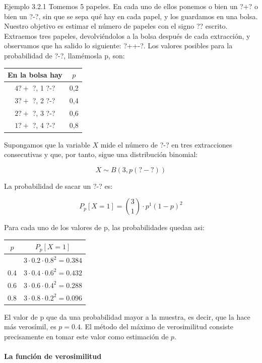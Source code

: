 \documentclass[
]{article}
\begin{document}
Ejemplo 3.2.1 Tomemos 5 papeles. En cada uno de ellos ponemos o bien un ?+? o bien un ?-?, sin que se sepa qué hay en cada papel, y los guardamos en una bolsa. Nuestro objetivo es estimar el número de papeles con el signo ?? escrito. Extraemos tres papeles, devolviéndolos a la bolsa después de cada extracción, y observamos que ha salido lo siguiente: ?++-?. Los valores posibles para la probabilidad de ?-?, llamémosla p, son:

\begin{longtable}[]{@{}cc@{}}
\toprule\noalign{}
En la bolsa hay & \(p\) \\
\midrule\noalign{}
\endhead
\bottomrule\noalign{}
\endlastfoot
\(4 ?+\) ?, 1 ?-? & 0,2 \\
\(3 ?+\) ?, 2 ?-? & 0,4 \\
\(2 ?+\) ?, 3 ?-? & 0,6 \\
\(1 ?+\) ?, 4 ?-? & 0,8 \\
\end{longtable}

Supongamos que la variable \(X\) mide el número de ?-? en tres extracciones consecutivas y que, por tanto, sigue una distribución binomial:

\[
X \sim B(3, p(?-?))
\]

La probabilidad de sacar un ?-? es:

\[
P_{p}[X=1]=\binom{3}{1} \cdot p^{1}(1-p)^{2}
\]

Para cada uno de los valores de p, las probabilidades quedan asi:

\begin{longtable}[]{@{}cc@{}}
\toprule\noalign{}
\(p\) & \(P_{p}[X=1]\) \\
\midrule\noalign{}
\endhead
\bottomrule\noalign{}
\endlastfoot
0.2 & \(3 \cdot 0.2 \cdot 0.8^{2}=0.384\) \\
0.4 & \(3 \cdot 0.4 \cdot 0.6^{2}=0.432\) \\
0.6 & \(3 \cdot 0.6 \cdot 0.4^{2}=0.288\) \\
0.8 & \(3 \cdot 0.8 \cdot 0.2^{2}=0.096\) \\
\end{longtable}

El valor de p que da una probabilidad mayor a la muestra, es decir, que la hace más verosímil, es \(p=0.4\). El método del máximo de verosimilitud consiste precisamente en tomar este valor como estimación de \(p\).

\paragraph{La función de verosimilitud}\label{la-funciuxf3n-de-verosimilitud}
\end{document}
